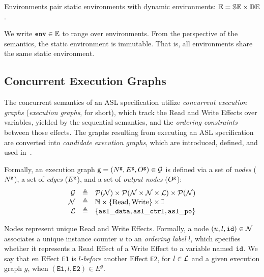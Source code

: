 \hypertarget{def-envs}{}
\begin{definition}[Environments]
Environments pair static environments with dynamic environments:
$\mathbb{E} = \mathbb{SE} \times \mathbb{DE}$.
\end{definition}
\hypertarget{def-env}{}
We write $\texttt{env} \in \mathbb{E}$ to range over environments.
%
From the perspective of the semantics, the static environment is immutable.
That is, all environments share the same static environment.

\subsection{Concurrent Execution Graphs\label{sec:concurrentexecutiongraphs}}
\hypertarget{def-executiongraph}{}
The concurrent semantics of an ASL specification utilize \emph{concurrent execution graphs}
(\emph{execution graphs}, for short),
which track the Read and Write Effects over variables, yielded by the sequential semantics,
and the \emph{ordering constraints} between those effects.
The graphs resulting from executing an ASL specification are converted into
\emph{candidate execution graphs}, which are introduced, defined,
and used in~\cite{AlglaveMT14,alglave2016syntax,AlglaveDGHM21}.

\hypertarget{def-xgraphs}{}
Formally, an execution graph $\textsf{g} = (N^{\textsf{g}}, E^{\textsf{g}}, O^{\textsf{g}}) \in \mathcal{G}$
is defined via a set of \emph{nodes} ($N^{\textsf{g}}$), a set of \emph{edges} ($E^{\textsf{g}}$), and a set of \emph{output nodes} ($O^{\textsf{g}}$):
\hypertarget{def-nodes}{}
\[
\begin{array}{rcl}
\XGraphs &\triangleq& \pow{\Nodes} \times \pow{\Nodes \times \Nodes \times \Labels} \times \pow{\Nodes}  \hypertarget{def-read}{}\hypertarget{def-write}{}\\
\Nodes   &\triangleq& \N \times \{ \Read, \Write \} \times \Identifiers \hypertarget{def-labels}{}\\
\Labels  &\triangleq& \{ \asldata, \aslctrl, \aslpo \}
\end{array}
\]

Nodes represent unique Read and Write Effects. Formally, a node $(u,l,\texttt{id}) \in \mathcal{N}$ associates a unique instance counter $u$
to an \emph{ordering label} $l$, which specifies whether it represents a Read Effect of a Write Effect to a variable named $\texttt{id}$.
%
We say that en Effect \texttt{E1} is \emph{$l$-before} another Effect \texttt{E2}, for $l\in \mathcal{L}$ and a given execution graph
$g$, when $(\texttt{E1}, l, \texttt{E2}) \in E^g$.

